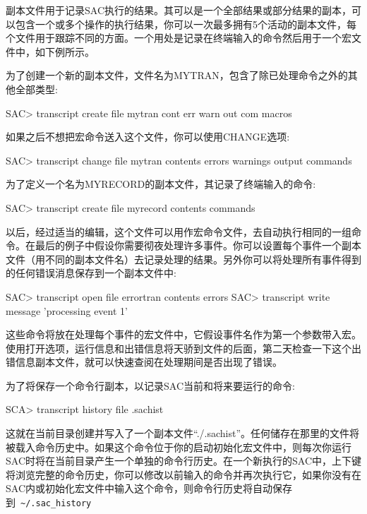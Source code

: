 副本文件用于记录SAC执行的结果。其可以是一个全部结果或部分结果的副本，可以包含一个或多个操作的执行结果，你可以一次最多拥有5个活动的副本文件，每个文件用于跟踪不同的方面。一个用处是记录在终端输入的命令然后用于一个宏文件中，如下例所示。

为了创建一个新的副本文件，文件名为MYTRAN，包含了除已处理命令之外的其他全部类型:
\begin{SACCode}
SAC> transcript create file mytran cont err warn out com macros
\end{SACCode}

如果之后不想把宏命令送入这个文件，你可以使用CHANGE选项:
\begin{SACCode}
SAC> transcript change file mytran contents errors warnings output commands
\end{SACCode}

为了定义一个名为MYRECORD的副本文件，其记录了终端输入的命令:
\begin{SACCode}
SAC> transcript create file myrecord contents commands
\end{SACCode}

以后，经过适当的编辑，这个文件可以用作宏命令文件，去自动执行相同的一组命令。在最后的例子中假设你需要彻夜处理许多事件。你可以设置每个事件一个副本文件（用不同的副本文件名）去记录处理的结果。另外你可以将处理所有事件得到的任何错误消息保存到一个副本文件中:
\begin{SACCode}
SAC> transcript open file errortran contents errors
SAC> transcript write message 'processing event 1'
\end{SACCode}

这些命令将放在处理每个事件的宏文件中，它假设事件名作为第一个参数带入宏。使用打开选项，运行信息和出错信息将天骄到文件的后面，第二天检查一下这个出错信息副本文件，就可以快速查阅在处理期间是否出现了错误。

为了将保存一个命令行副本，以记录SAC当前和将来要运行的命令:
\begin{SACCode}
SCA> transcript history file .sachist
\end{SACCode}
这就在当前目录创建并写入了一个副本文件``./.sachist''。任何储存在那里的文件将被载入命令历史中。如果这个命令位于你的启动初始化宏文件中，则每次你运行SAC时将在当前目录产生一个单独的命令行历史。在一个新执行的SAC中，上下键将浏览完整的命令历史，你可以修改以前输入的命令并再次执行它，如果你没有在SAC内或初始化宏文件中输入这个命令，则命令行历史将自动保存到~\lstinline{~/.sac_history}
